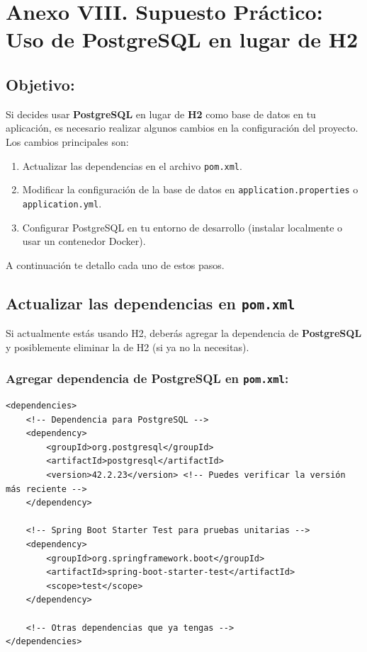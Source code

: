 \documentclass[11pt]{article}
\begin{document}
\section{Anexo VIII. Supuesto Práctico: Uso de PostgreSQL en lugar de H2}
\label{sec:org1f96ff0}

\subsection{Objetivo:}
\label{sec:org46c23f7}
Si decides usar \textbf{\textbf{PostgreSQL}} en lugar de \textbf{\textbf{H2}} como base de datos en tu aplicación, es necesario realizar algunos cambios en la configuración del proyecto. Los cambios principales son:

\begin{enumerate}
\item Actualizar las dependencias en el archivo \texttt{pom.xml}.
\item Modificar la configuración de la base de datos en \texttt{application.properties} o \texttt{application.yml}.
\item Configurar PostgreSQL en tu entorno de desarrollo (instalar localmente o usar un contenedor Docker).
\end{enumerate}

A continuación te detallo cada uno de estos pasos.

\subsection{Actualizar las dependencias en \texttt{pom.xml}}
\label{sec:org26d1f7f}

Si actualmente estás usando H2, deberás agregar la dependencia de \textbf{\textbf{PostgreSQL}} y posiblemente eliminar la de H2 (si ya no la necesitas).

\subsubsection{Agregar dependencia de PostgreSQL en \texttt{pom.xml}:}
\label{sec:orgfcec906}

\begin{verbatim}
<dependencies>
    <!-- Dependencia para PostgreSQL -->
    <dependency>
        <groupId>org.postgresql</groupId>
        <artifactId>postgresql</artifactId>
        <version>42.2.23</version> <!-- Puedes verificar la versión más reciente -->
    </dependency>

    <!-- Spring Boot Starter Test para pruebas unitarias -->
    <dependency>
        <groupId>org.springframework.boot</groupId>
        <artifactId>spring-boot-starter-test</artifactId>
        <scope>test</scope>
    </dependency>

    <!-- Otras dependencias que ya tengas -->
</dependencies>
\end{verbatim}
\end{document}

